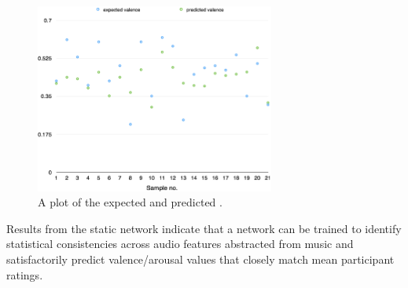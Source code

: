 \begin{figure}[t]
    \includegraphics[width=0.7\textwidth]{Figures/finalvalence}
    \centering

  \caption{A plot of the expected and predicted .}
  \label{fig:anneval}
\end{figure}


Results from the static network indicate that a network can be trained to identify statistical consistencies across audio features abstracted from music and satisfactorily predict valence/arousal values that closely match mean participant ratings.


